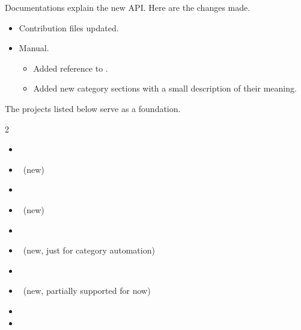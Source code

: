 \documentclass{tutodoc}
\begin{document}
\begin{tdocupdate}
    \item Documentations explain the new API. Here are the changes made.
    \begin{itemize}
        \item Contribution  files updated.


        \item Manual.
        \begin{itemize}
            \item Added reference to \carbonplan.

            \item Added new category sections with a small description of their meaning.
        \end{itemize}
    \end{itemize}


    \item The projects listed below serve as a foundation.

    \bgroup
    \setlength{\multicolsep}{3pt}
    \begin{multicols}{2}
    \begin{itemize}
        \item \asymptote
        \item \carbonplan\      (new)
        \item \cartocolors
        \item \cmasher\         (new)
        \item {}
        \item {}\       (new, just for category automation)
        \item \matplotlib
        \item \nclcolortables\  (new, partially supported for now)
        \item \palettable
        \item \scicolmap
    \end{itemize}
    \end{multicols}
    \egroup
\end{tdocupdate}
\end{document}
